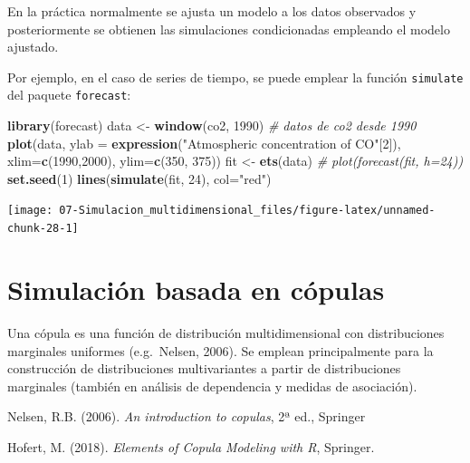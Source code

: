 \documentclass[]{book}
\newenvironment{Shaded}{\begin{snugshade}}{\end{snugshade}}
\newcommand{\KeywordTok}[1]{\textcolor[rgb]{0.13,0.29,0.53}{\textbf{#1}}}
\newcommand{\DataTypeTok}[1]{\textcolor[rgb]{0.13,0.29,0.53}{#1}}
\newcommand{\DecValTok}[1]{\textcolor[rgb]{0.00,0.00,0.81}{#1}}
\newcommand{\StringTok}[1]{\textcolor[rgb]{0.31,0.60,0.02}{#1}}
\newcommand{\CommentTok}[1]{\textcolor[rgb]{0.56,0.35,0.01}{\textit{#1}}}
\newcommand{\NormalTok}[1]{#1}
\theoremstyle{definition}
\theoremstyle{definition}
\theoremstyle{definition}
\theoremstyle{remark}
\begin{document}
En la práctica normalmente se ajusta un modelo a los datos observados y
posteriormente se obtienen las simulaciones condicionadas empleando el
modelo ajustado.

Por ejemplo, en el caso de series de tiempo, se puede emplear la función
\texttt{simulate} del paquete \texttt{forecast}:

\begin{Shaded}
\begin{Highlighting}[]
\KeywordTok{library}\NormalTok{(forecast)}
\NormalTok{data <-}\StringTok{ }\KeywordTok{window}\NormalTok{(co2, }\DecValTok{1990}\NormalTok{) }\CommentTok{# datos de co2 desde 1990}
\KeywordTok{plot}\NormalTok{(data, }\DataTypeTok{ylab =} \KeywordTok{expression}\NormalTok{(}\StringTok{"Atmospheric concentration of CO"}\NormalTok{[}\DecValTok{2}\NormalTok{]), }
     \DataTypeTok{xlim=}\KeywordTok{c}\NormalTok{(}\DecValTok{1990}\NormalTok{,}\DecValTok{2000}\NormalTok{), }\DataTypeTok{ylim=}\KeywordTok{c}\NormalTok{(}\DecValTok{350}\NormalTok{, }\DecValTok{375}\NormalTok{))}
\NormalTok{fit <-}\StringTok{ }\KeywordTok{ets}\NormalTok{(data)}
\CommentTok{# plot(forecast(fit, h=24))}
\KeywordTok{set.seed}\NormalTok{(}\DecValTok{1}\NormalTok{)}
\KeywordTok{lines}\NormalTok{(}\KeywordTok{simulate}\NormalTok{(fit, }\DecValTok{24}\NormalTok{), }\DataTypeTok{col=}\StringTok{"red"}\NormalTok{)}
\end{Highlighting}
\end{Shaded}

\begin{center}\texttt{[image: 07-Simulacion\_multidimensional\_files/figure-latex/unnamed-chunk-28-1]} \end{center}

\section{Simulación basada en
cópulas}\label{simulacion-basada-en-copulas}

Una cópula es una función de distribución multidimensional con
distribuciones marginales uniformes (e.g.~Nelsen, 2006). Se emplean
principalmente para la construcción de distribuciones multivariantes a
partir de distribuciones marginales (también en análisis de dependencia
y medidas de asociación).

Nelsen, R.B. (2006). \emph{An introduction to copulas}, 2ª ed., Springer

Hofert, M. (2018). \emph{Elements of Copula Modeling with R}, Springer.
\end{document}
